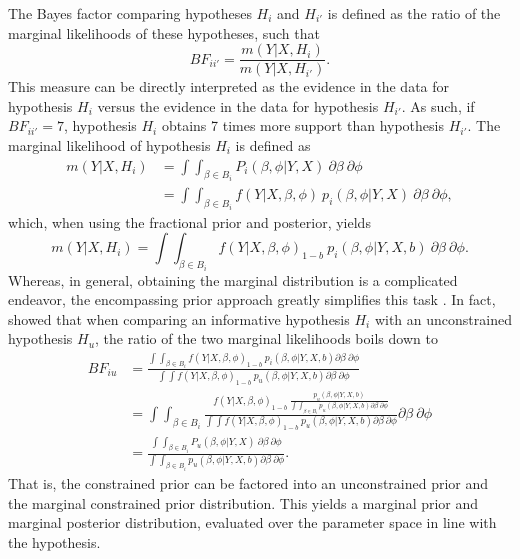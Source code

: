 \documentclass[review, 3p, authoryear]{elsarticle} %
\begin{document}
The Bayes factor comparing hypotheses \(H_i\) and \(H_{i'}\) is defined as the ratio of the marginal likelihoods of these hypotheses, such that
\[
BF_{ii'} = \frac{m(Y | X, H_i)}{m(Y | X, H_{i'})}.
\]
This measure can be directly interpreted as the evidence in the data for hypothesis \(H_i\) versus the evidence in the data for hypothesis \(H_{i'}\).
As such, if \(BF_{ii'} = 7\), hypothesis \(H_i\) obtains 7 times more support than hypothesis \(H_{i'}\).
The marginal likelihood of hypothesis \(H_i\) is defined as
\[
\begin{aligned}
m(Y | X, H_i) 
&= \int \int_{\beta \in B_i}  P_i(\beta, \phi | Y, X) ~ \partial \beta ~ \partial \phi \\
&= \int \int_{\beta \in B_i} f(Y | X, \beta, \phi) ~ p_i(\beta, \phi | Y, X) ~ \partial \beta ~ \partial \phi,
\end{aligned}
\]
which, when using the fractional prior and posterior, yields
\[
m(Y | X, H_i) = 
  \int \int_{\beta \in B_i}  f(Y | X, \beta, \phi)_{1-b} ~ p_i(\beta, \phi | Y, X, b) ~ \partial \beta ~ \partial \phi.
\]
Whereas, in general, obtaining the marginal distribution is a complicated endeavor, the encompassing prior approach greatly simplifies this task \citep{klugkist_inequality_2005}.
In fact, \citet{gu_approximated_2018} showed that when comparing an informative hypothesis \(H_i\) with an unconstrained hypothesis \(H_u\), the ratio of the two marginal likelihoods boils down to
\[
\begin{aligned}
BF_{iu} &= 
\frac{
  \int \int_{\beta \in B_i} f (Y | X, \beta, \phi)_{1-b} ~ p_i(\beta, \phi | Y, X, b) \partial \beta ~ \partial \phi
}{
  \int \int f(Y | X, \beta, \phi)_{1-b} ~ p_u(\beta, \phi | Y, X, b) \partial \beta ~ \partial \phi
} \\
&= \int \int_{\beta \in B_i} 
\frac{
  f (Y | X, \beta, \phi)_{1-b} ~  \frac{p_u (\beta, \phi | Y, X, b)}{\int \int_{\beta \in B_i} p_u (\beta, \phi | Y, X, b) \partial \beta ~ \partial \phi}
}{
  \int \int f(Y|X, \beta, \phi)_{1-b} ~ p_u(\beta, \phi | Y, X, b) \partial \beta ~ \partial \phi
} \partial \beta ~ \partial \phi \\
&= \frac{
   \int \int_{\beta \in B_i} P_u(\beta, \phi|Y, X) ~ \partial \beta ~ \partial \phi
}{
  \int\int_{\beta \in B_i} p_u(\beta, \phi | Y, X, b) \partial \beta ~ \partial \phi
}.
\end{aligned}
\]
That is, the constrained prior can be factored into an unconstrained prior and the marginal constrained prior distribution.
This yields a marginal prior and marginal posterior distribution, evaluated over the parameter space in line with the hypothesis.
\end{document}
